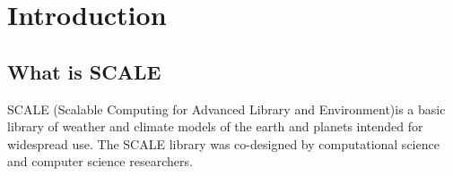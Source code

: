 \chapter{Introduction}


\section{What is SCALE}
SCALE (Scalable Computing for Advanced Library and Environment)is a basic library of weather and climate models of the earth and planets intended for widespread use.
The SCALE library was co-designed by computational science and computer science researchers.

